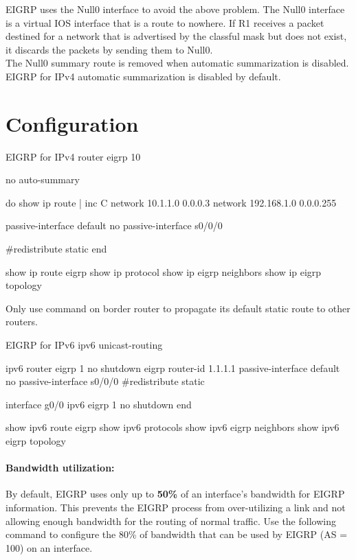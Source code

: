 EIGRP uses the Null0 interface to avoid the above problem. The Null0 interface is a virtual IOS interface that is a route to nowhere. If R1 receives a packet destined for a network that is advertised by the classful mask but does not exist, it discards the packets by sending them to Null0.\\
 
\note The Null0 summary route is removed when automatic summarization is disabled.\\
\note EIGRP for IPv4 automatic summarization is disabled by default.

\section{Configuration}

\begin{sexylisting}{EIGRP for IPv4}
router eigrp 10

no auto-summary

do show ip route | inc C
network 10.1.1.0 0.0.0.3
network 192.168.1.0 0.0.0.255 

passive-interface default
no passive-interface s0/0/0
  
#redistribute static
end

show ip route eigrp
show ip protocol
show ip eigrp neighbors
show ip eigrp topology
\end{sexylisting}
		
\note Only use  command on border router to propagate its default static route to other routers. 

\begin{sexylisting}{EIGRP for IPv6}
ipv6 unicast-routing

ipv6 router eigrp 1 
  no shutdown
  eigrp router-id 1.1.1.1
  passive-interface default
  no passive-interface s0/0/0
  #redistribute static

interface g0/0 
	ipv6 eigrp 1 
	no shutdown
end

show ipv6 route eigrp
show ipv6 protocols
show ipv6 eigrp neighbors	
show ipv6 eigrp topology
\end{sexylisting}

\paragraph{Bandwidth utilization:} By default, EIGRP uses only up to \textbf{50\%} of an interface's bandwidth for EIGRP information. This prevents the EIGRP process from over-utilizing a link and not allowing enough bandwidth for the routing of normal traffic. Use the following command to configure the 80\% of bandwidth that can be used by EIGRP (AS = 100) on an interface.

